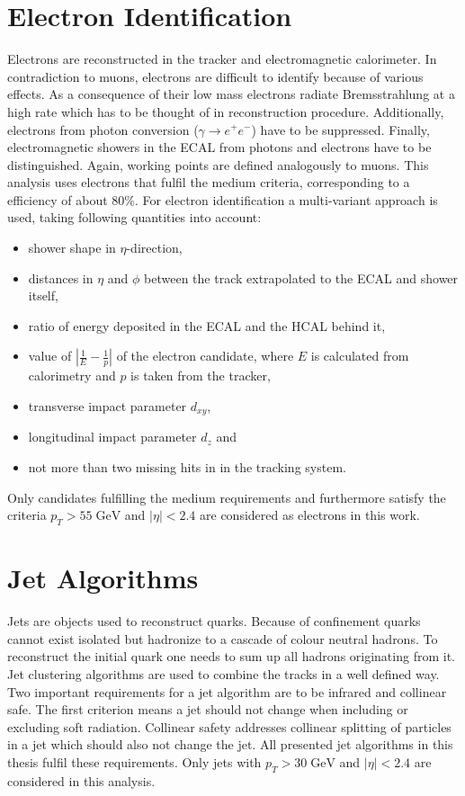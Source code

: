 \section{Electron Identification}
	Electrons are reconstructed in the tracker and electromagnetic calorimeter. In contradiction to muons, electrons are difficult to identify because of various effects. As a consequence of their low mass electrons radiate Bremsstrahlung at a high rate which has to be thought of in reconstruction procedure. Additionally, electrons from photon conversion ($\gamma \rightarrow e^+ e^-$) have to be suppressed. Finally, electromagnetic showers in the ECAL from photons and electrons have to be distinguished. Again, working points \cite{ElecID} are defined analogously to muons. This analysis uses electrons that fulfil the medium criteria, corresponding to a efficiency of about $80\%$. For electron identification a multi-variant approach is used, taking following quantities into account:
	\begin{itemize}
	\item shower shape in $\eta$-direction,
	\item distances in $\eta$ and $\phi$ between the track extrapolated to the ECAL and shower itself,
	\item ratio of energy deposited in the ECAL and the HCAL behind it,
	\item value of $|\frac{1}{E} - \frac{1}{p}|$ of the electron candidate, where $E$ is calculated from calorimetry and $p$ is taken from the tracker,
	\item transverse impact parameter $d_{xy}$,
	\item longitudinal impact parameter $d_{z}$ and
	\item not more than two missing hits in in the tracking system.
	\end{itemize}
	Only candidates fulfilling the medium requirements and furthermore satisfy the criteria $p_T > 55\;\text{GeV}$ and $|\eta| < 2.4$ are considered as electrons in this work.
\section{Jet Algorithms}
	Jets are objects used to reconstruct quarks. Because of confinement quarks cannot exist isolated but hadronize to a cascade of colour neutral hadrons. To reconstruct the initial quark one needs to sum up all hadrons originating from it. Jet clustering algorithms are used to combine the tracks in a well defined way. Two important requirements for a jet algorithm are to be infrared and collinear safe. The first criterion means a jet should not change when including or excluding soft radiation. Collinear safety addresses collinear splitting of particles in a jet which should also not change the jet. All presented jet algorithms in this thesis fulfil these requirements. Only jets with $p_T > 30\;\text{GeV}$ and $|\eta| < 2.4$ are considered in this analysis.
	

